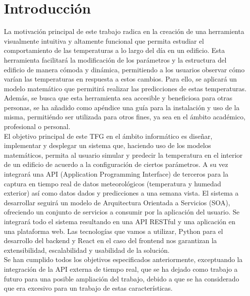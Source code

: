 %


\chapter{Introducción}
La motivación principal de este trabajo radica en la creación de una herramienta visualmente intuitiva y altamente funcional que permita estudiar el comportamiento de las temperaturas a lo largo del día en un edificio. Esta herramienta facilitará la modificación de los parámetros y la estructura del edificio de manera cómoda y dinámica, permitiendo a los usuarios observar cómo varían las temperaturas en respuesta a estos cambios. Para ello, se aplicará un modelo matemático que permitirá realizar las predicciones de estas temperaturas. Además, se busca que esta herramienta sea accesible y beneficiosa para otras personas, se ha añadido como apéndice una guía para la instalación y uso de la misma, permitiéndo ser utilizada para otros fines, ya sea en el ámbito académico, profesional o personal.\\

El objetivo principal de este TFG en el ámbito informático es diseñar, implementar y desplegar un sistema que, haciendo uso de los modelos matemáticos, permita al usuario simular y predecir la temperatura en el interior de un edificio de acuerdo a la configuración de ciertos parámetros. A su vez integrará una API (Application Programming Interface) de terceros para la captura en tiempo real de datos meteorológicos (temperatura y humedad exterior) así como datos dados y predicciones a una semana vista. El sistema a desarrollar seguirá un modelo de Arquitectura Orientada a Servicios (SOA), ofreciendo un conjunto de servicios a consumir por la aplicación del usuario. Se integrará todo el sistema resultando en una API RESTful y una aplicación en una plataforma web. Las tecnologías que vamos a utilizar, Python para el desarrollo del backend y React en el caso del frontend nos garantizan la extensibilidad, escalabilidad y usabilidad de la solución.\\
Se han cumplido todos los objetivos especificados anteriormente, exceptuando la integración de la API externa de tiempo real, que se ha dejado como trabajo a futuro para una posible ampliación del trabajo, debido a que se ha considerado que era excesivo para un trabajo de estas características.

